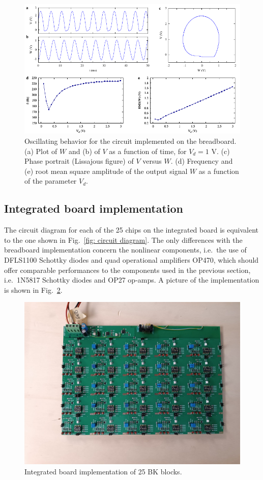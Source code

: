 \begin{figure}[!htbp]
    \centering
    \includegraphics[width=\linewidth]{../blocks/1_block/breadboard/single_block.pdf}
    \caption{Oscillating behavior for the circuit implemented on
    the breadboard. (a) Plot of $W$ and (b) of $V$ as a function of time,
    for $V_d=1$ V.
    (c) Phase portrait (Lissajous figure) of $V$ versus $W$. (d)
    Frequency and (e) root mean square amplitude of the
    output signal $W$ as a function of the parameter $V_d$.
    }\label{fig:oscillation breadboard}
\end{figure}


\subsection{Integrated board implementation}\label{subsec:integrated board implementation}

The circuit diagram for each of the 25 chips on the integrated board is equivalent to the
one shown in Fig.~\ref{fig: circuit diagram}. The only differences with the breadboard implementation
concern the nonlinear components, i.e.\ the use of DFLS1100 Schottky diodes and quad operational
amplifiers OP470, which should offer comparable performances to the components used in the previous section,
i.e.\ 1N5817 Schottky diodes and OP27 op-amps.
A picture of the implementation is shown in Fig.~\ref{fig: photo integrated board}.

\begin{figure}[!htbp]
    \centering
        \includegraphics[width=.8\linewidth]{images/photo_integrated_board.jpeg}
        \caption{Integrated board implementation of 25 BK blocks.
        }\label{fig: photo integrated board}
\end{figure}


